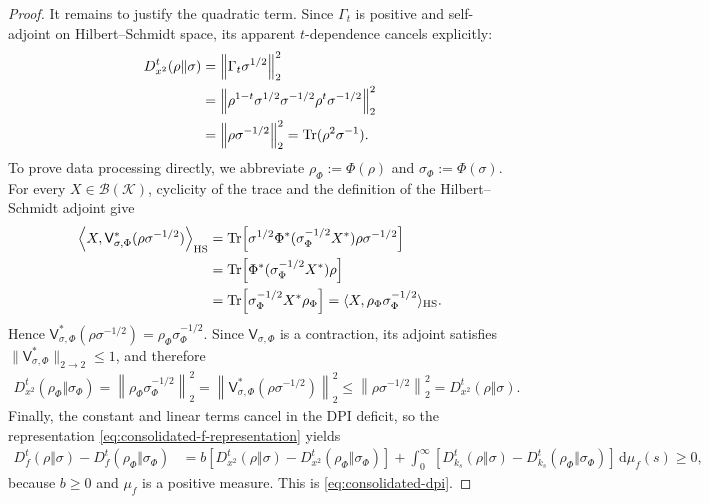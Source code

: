 \documentclass[11pt]{article}
\theoremstyle{remark}
\newcommand{\1}{\mathbbm{1}}
\begin{document}
\begin{proof}
It remains to justify the quadratic term.  Since $\Gamma_t$ is
positive and self-adjoint on Hilbert--Schmidt space, its apparent
$t$-dependence cancels explicitly:
\begin{align}
 D_{x^2}^t(\rho\Vert\sigma)
 &=\left\lVert\Gamma_t\sigma^{1/2}\right\rVert_2^2\notag\\
 &=\left\lVert
   \rho^{1-t}\sigma^{1/2}\sigma^{-1/2}
   \rho^t\sigma^{-1/2}\right\rVert_2^2\notag\\
 &=\left\lVert\rho\sigma^{-1/2}\right\rVert_2^2
 =\operatorname{Tr}(\rho^2\sigma^{-1}).
 \label{eq:consolidated-quadratic-independence}
\end{align}
To prove data processing directly, we abbreviate
$\rho_\Phi:=\Phi(\rho)$ and $\sigma_\Phi:=\Phi(\sigma)$.  For every
$X\in\mathcal B(\mathcal K)$, cyclicity of the trace and the
definition of the Hilbert--Schmidt adjoint give
\begin{equation*}
\begin{split}
 \left\langle X,
 \mathsf V_{\sigma,\Phi}^*(\rho\sigma^{-1/2})\right\rangle_{\rm HS}
 &=\operatorname{Tr}\!\left[
   \sigma^{1/2}\Phi^*(\sigma_\Phi^{-1/2}X^*)
   \rho\sigma^{-1/2}\right]\\
 &=\operatorname{Tr}\!\left[
   \Phi^*(\sigma_\Phi^{-1/2}X^*)\rho\right]\\
 &=\operatorname{Tr}\!\left[\sigma_\Phi^{-1/2}X^*\rho_\Phi\right]
 =\langle X,\rho_\Phi\sigma_\Phi^{-1/2}\rangle_{\rm HS}.
\end{split}
\end{equation*}
Hence
$\mathsf V_{\sigma,\Phi}^*(\rho\sigma^{-1/2})
=\rho_\Phi\sigma_\Phi^{-1/2}$.
Since $\mathsf V_{\sigma,\Phi}$ is a contraction, its adjoint satisfies
$\lVert\mathsf V_{\sigma,\Phi}^*\rVert_{2\to2}\leq1$, and therefore
\begin{align*}
 D_{x^2}^t(\rho_\Phi\Vert\sigma_\Phi)
 =\left\lVert\rho_\Phi\sigma_\Phi^{-1/2}\right\rVert_2^2
 =\left\lVert
   \mathsf V_{\sigma,\Phi}^*(\rho\sigma^{-1/2})
  \right\rVert_2^2
 \leq\left\lVert\rho\sigma^{-1/2}\right\rVert_2^2
 =D_{x^2}^t(\rho\Vert\sigma).
\end{align*}
Finally, the constant and linear terms cancel in the DPI deficit, so
the representation \eqref{eq:consolidated-f-representation} yields
\begin{align*}
 D_f^t(\rho\Vert\sigma)
   -D_f^t(\rho_\Phi\Vert\sigma_\Phi)
 &=b\!\left[
   D_{x^2}^t(\rho\Vert\sigma)
   -D_{x^2}^t(\rho_\Phi\Vert\sigma_\Phi)\right]
+\int_0^\infty\!\left[
   D_{k_s}^t(\rho\Vert\sigma)
   -D_{k_s}^t(\rho_\Phi\Vert\sigma_\Phi)
   \right]\,\mathrm d\mu_f(s)\geq0,
\end{align*}
because $b\geq0$ and $\mu_f$ is a positive measure.  This is
\eqref{eq:consolidated-dpi}.
\end{proof}
\end{document}
